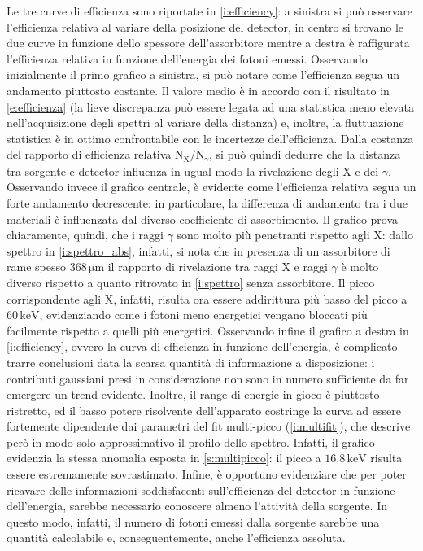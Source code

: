 \documentclass[twocolumn,10pt]{asme2ej}
\begin{document}
Le tre curve di efficienza sono riportate in \autoref{i:efficiency}: a sinistra si può osservare l'efficienza relativa
al variare della posizione del detector, in centro si trovano le due curve in funzione dello spessore dell'assorbitore
mentre a destra è raffigurata l'efficienza relativa in funzione dell'energia dei fotoni emessi. Osservando inizialmente
il primo grafico a sinistra, si può notare come l'efficienza segua un andamento piuttosto costante. Il valore medio è in
accordo con il risultato in \autoref{e:efficienza} (la lieve discrepanza può essere legata ad una statistica meno
elevata nell'acquisizione degli spettri al variare della distanza) e, inoltre, la fluttuazione statistica è in ottimo
confrontabile con le incertezze dell'efficienza. Dalla costanza del rapporto di efficienza relativa
$\text{N}_{\text{X}}/\text{N}_{\gamma}$, si può quindi dedurre che la distanza tra sorgente e detector influenza in
ugual modo la rivelazione degli X e dei $\gamma$. Osservando invece il grafico centrale, è evidente come l'efficienza
relativa segua un forte andamento decrescente: in particolare, la differenza di andamento tra i due materiali è
influenzata dal diverso coefficiente di assorbimento. Il grafico prova chiaramente, quindi, che i raggi $\gamma$ sono
molto più penetranti rispetto agli X: dallo spettro in \autoref{i:spettro_abs}, infatti, si nota che in presenza di un
assorbitore di rame spesso $368\,\si{\micro\metre}$ il rapporto di rivelazione tra raggi X e raggi $\gamma$ è molto
diverso rispetto a quanto ritrovato in \autoref{i:spettro} senza assorbitore. Il picco corrispondente agli X, infatti,
risulta ora essere addirittura più basso del picco a $60\,\si{\kilo\electronvolt}$, evidenziando come i fotoni meno
energetici vengano bloccati più facilmente rispetto a quelli più energetici. Osservando infine il grafico a destra in
\autoref{i:efficiency}, ovvero la curva di efficienza in funzione dell'energia, è complicato trarre conclusioni data la
scarsa quantità di informazione a disposizione: i contributi gaussiani presi in considerazione non sono in numero
sufficiente da far emergere un trend evidente. Inoltre, il range di energie in gioco è piuttosto ristretto, ed il basso
potere risolvente dell'apparato costringe la curva ad essere fortemente dipendente dai parametri del fit multi-picco
(\autoref{i:multifit}), che descrive però in modo solo approssimativo il profilo dello spettro. Infatti, il grafico
evidenzia la stessa anomalia esposta in \autoref{s:multipicco}: il picco a $16.8\,\si{\kilo\electronvolt}$ risulta
essere estremamente sovrastimato. Infine, è opportuno evidenziare che per poter ricavare delle informazioni
soddisfacenti sull'efficienza del detector in funzione dell'energia, sarebbe necessario conoscere almeno l'attività
della sorgente. In questo modo, infatti, il numero di fotoni emessi dalla sorgente sarebbe una quantità calcolabile e,
conseguentemente, anche l'efficienza assoluta. 
\end{document}

